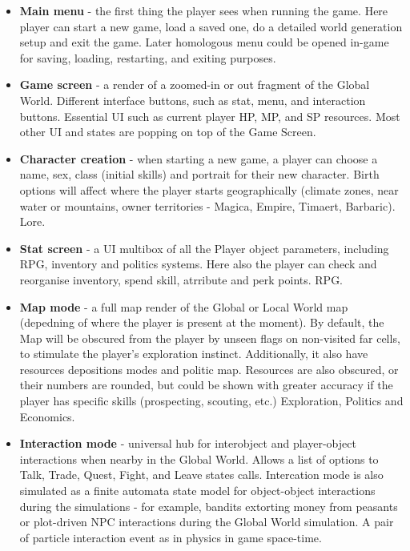  \begin{itemize}
 
 \item \textbf{Main menu} - the first thing the player sees when running the game. Here player can start a new game, load a saved one, do a detailed world generation setup and exit the game. Later homologous menu could be opened in-game for saving, loading, restarting, and exiting purposes.
 
 \item \textbf{Game screen} - a render of a zoomed-in or out fragment of the Global World. Different interface buttons, such as stat, menu, and interaction buttons. Essential UI such as current player HP, MP, and SP resources. Most other UI and states are popping on top of the Game Screen.
 
  \item \textbf{Character creation} - when starting a new game, a player can choose a name, sex, class (initial skills) and portrait for their new character. Birth options will affect where the player starts geographically (climate zones, near water or mountains, owner territories - Magica, Empire, Timaert, Barbaric). Lore.
 
 \item \textbf{Stat screen} - a UI multibox of all the Player object parameters, including RPG, inventory and politics systems. Here also the player can check and reorganise inventory, spend skill, atrribute and perk points. RPG.

 \item \textbf{Map mode} - a full map render of the Global or Local World map (depedning of where the player is present at the moment). By default, the Map will be obscured from the player by unseen flags on non-visited far cells, to stimulate the player's exploration instinct. Additionally, it also have resources depositions modes and politic map. Resources are also obscured, or their numbers are rounded, but could be shown with greater accuracy if the player has specific skills (prospecting, scouting, etc.) Exploration, Politics and Economics.
 
 \item \textbf{Interaction mode} - universal hub for interobject and player-object interactions when nearby in the Global World. Allows a list of options to Talk, Trade, Quest, Fight, and Leave states calls. Intercation mode is also simulated as a finite automata state model for object-object interactions during the simulations - for example, bandits extorting money from peasants or plot-driven NPC interactions during the Global World simulation. A pair of particle interaction event as in physics in game space-time.
  

\end{itemize}
